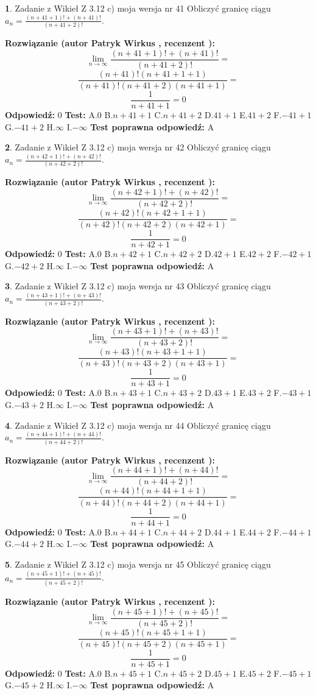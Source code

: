 \documentclass[12pt, a4paper]{article}
\theoremstyle{definition} %
\newtheorem{zad}{}
\newcommand{\zadStart}[1]{\begin{zad}#1\newline}
\newcommand{\zadStop}{\end{zad}}
\newcommand{\rozwStart}[2]{\noindent \textbf{Rozwiązanie (autor #1 , recenzent #2): }\newline}
\newcommand{\rozwStop}{\newline}
\newcommand{\odpStart}{\noindent \textbf{Odpowiedź:}\newline}
\newcommand{\odpStop}{\newline}
\newcommand{\testStart}{\noindent \textbf{Test:}\newline}
\newcommand{\testStop}{\newline}
\newcommand{\kluczStart}{\noindent \textbf{Test poprawna odpowiedź:}\newline}
\newcommand{\kluczStop}{\newline}
\begin{document}
\zadStart{Zadanie z Wikieł Z 3.12 c) moja wersja nr 41}
Obliczyć granicę ciągu $a_{n}=\frac{(n+41+1)!+(n+41)!}{(n+41+2)!}$.
\zadStop
\rozwStart{Patryk Wirkus}{}
$$\lim\limits_{n\to\infty}\frac{(n+41+1)!+(n+41)!}{(n+41+2)!}=$$
$$\frac{(n+41)!(n+41+1+1)}{(n+41)!(n+41+2)(n+41+1)}=$$
$$\frac{1}{n+41+1}= 0$$
\rozwStop
\odpStart
$0$
\odpStop
\testStart
A.$0$
B.$n+41+1$
C.$n+41+2$
D.$41+1$
E.$41+2$
F.$-41+1$
G.$-41+2$
H.$\infty$
I.$-\infty$
\testStop
\kluczStart
A
\kluczStop



\zadStart{Zadanie z Wikieł Z 3.12 c) moja wersja nr 42}
Obliczyć granicę ciągu $a_{n}=\frac{(n+42+1)!+(n+42)!}{(n+42+2)!}$.
\zadStop
\rozwStart{Patryk Wirkus}{}
$$\lim\limits_{n\to\infty}\frac{(n+42+1)!+(n+42)!}{(n+42+2)!}=$$
$$\frac{(n+42)!(n+42+1+1)}{(n+42)!(n+42+2)(n+42+1)}=$$
$$\frac{1}{n+42+1}= 0$$
\rozwStop
\odpStart
$0$
\odpStop
\testStart
A.$0$
B.$n+42+1$
C.$n+42+2$
D.$42+1$
E.$42+2$
F.$-42+1$
G.$-42+2$
H.$\infty$
I.$-\infty$
\testStop
\kluczStart
A
\kluczStop



\zadStart{Zadanie z Wikieł Z 3.12 c) moja wersja nr 43}
Obliczyć granicę ciągu $a_{n}=\frac{(n+43+1)!+(n+43)!}{(n+43+2)!}$.
\zadStop
\rozwStart{Patryk Wirkus}{}
$$\lim\limits_{n\to\infty}\frac{(n+43+1)!+(n+43)!}{(n+43+2)!}=$$
$$\frac{(n+43)!(n+43+1+1)}{(n+43)!(n+43+2)(n+43+1)}=$$
$$\frac{1}{n+43+1}= 0$$
\rozwStop
\odpStart
$0$
\odpStop
\testStart
A.$0$
B.$n+43+1$
C.$n+43+2$
D.$43+1$
E.$43+2$
F.$-43+1$
G.$-43+2$
H.$\infty$
I.$-\infty$
\testStop
\kluczStart
A
\kluczStop



\zadStart{Zadanie z Wikieł Z 3.12 c) moja wersja nr 44}
Obliczyć granicę ciągu $a_{n}=\frac{(n+44+1)!+(n+44)!}{(n+44+2)!}$.
\zadStop
\rozwStart{Patryk Wirkus}{}
$$\lim\limits_{n\to\infty}\frac{(n+44+1)!+(n+44)!}{(n+44+2)!}=$$
$$\frac{(n+44)!(n+44+1+1)}{(n+44)!(n+44+2)(n+44+1)}=$$
$$\frac{1}{n+44+1}= 0$$
\rozwStop
\odpStart
$0$
\odpStop
\testStart
A.$0$
B.$n+44+1$
C.$n+44+2$
D.$44+1$
E.$44+2$
F.$-44+1$
G.$-44+2$
H.$\infty$
I.$-\infty$
\testStop
\kluczStart
A
\kluczStop



\zadStart{Zadanie z Wikieł Z 3.12 c) moja wersja nr 45}
Obliczyć granicę ciągu $a_{n}=\frac{(n+45+1)!+(n+45)!}{(n+45+2)!}$.
\zadStop
\rozwStart{Patryk Wirkus}{}
$$\lim\limits_{n\to\infty}\frac{(n+45+1)!+(n+45)!}{(n+45+2)!}=$$
$$\frac{(n+45)!(n+45+1+1)}{(n+45)!(n+45+2)(n+45+1)}=$$
$$\frac{1}{n+45+1}= 0$$
\rozwStop
\odpStart
$0$
\odpStop
\testStart
A.$0$
B.$n+45+1$
C.$n+45+2$
D.$45+1$
E.$45+2$
F.$-45+1$
G.$-45+2$
H.$\infty$
I.$-\infty$
\testStop
\kluczStart
A
\kluczStop
\end{document}
